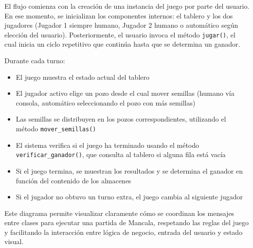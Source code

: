 \documentclass{article}
\begin{document}
El flujo comienza con la creación de una instancia del juego por parte del usuario. En ese momento, se inicializan los componentes internos: el tablero y los dos jugadores (Jugador 1 siempre humano, Jugador 2 humano o automático según elección del usuario). Posteriormente, el usuario invoca el método \texttt{jugar()}, el cual inicia un ciclo repetitivo que continúa hasta que se determina un ganador.

Durante cada turno:
\begin{itemize}
    \item El juego muestra el estado actual del tablero
    \item El jugador activo elige un pozo desde el cual mover semillas (humano vía consola, automático seleccionando el pozo con más semillas)
    \item Las semillas se distribuyen en los pozos correspondientes, utilizando el método \texttt{mover\_semillas()}
    \item El sistema verifica si el juego ha terminado usando el método \texttt{verificar\_ganador()}, que consulta al tablero si alguna fila está vacía
    \item Si el juego termina, se muestran los resultados y se determina el ganador en función del contenido de los almacenes
    \item Si el jugador no obtuvo un turno extra, el juego cambia al siguiente jugador
\end{itemize}


Este diagrama permite visualizar claramente cómo se coordinan los mensajes entre clases para ejecutar una partida de Mancala, respetando las reglas del juego y facilitando la interacción entre lógica de negocio, entrada del usuario y estado visual.
\end{document}
